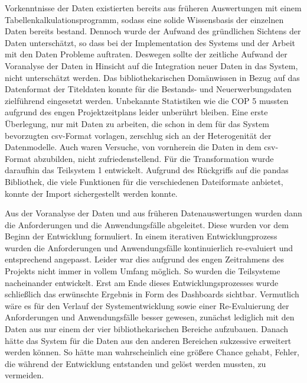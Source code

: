 Vorkenntnisse der Daten existierten bereits aus früheren Auswertungen mit einem Tabellenkalkulationsprogramm, sodass eine solide Wissensbasis 
der einzelnen Daten bereits bestand. Dennoch wurde der Aufwand des gründlichen Sichtens der Daten unterschätzt, so dass bei 
der Implementation des Systems und der Arbeit mit den Daten Probleme auftraten. Deswegen sollte der zeitliche Aufwand der Voranalyse der Daten in Hinsicht auf die Integration neuer
Daten in das System, nicht unterschätzt werden. Das bibliothekarischen Domänwissen in Bezug auf das Datenformat der Titeldaten konnte
für die Bestands- und Neuerwerbungsdaten zielführend eingesetzt werden. Unbekannte Statistiken wie die \acrlong{COP 5} mussten aufgrund des engen Projektzeitplans leider unberührt bleiben.
Eine erste Überlegung, nur mit Daten zu arbeiten, die schon in dem für das System bevorzugten csv-Format vorlagen, 
zerschlug sich an der Heterogenität der Datenmodelle. Auch waren Versuche, von vornherein die Daten in dem csv-Format abzubilden, nicht zufriedenstellend.
Für die Transformation wurde daraufhin das Teilsystem 1 entwickelt.
Aufgrund des Rückgriffs auf die pandas Bibliothek, die viele Funktionen für die verschiedenen Dateiformate anbietet, konnte der Import sichergestellt werden konnte.

Aus der Voranalyse der Daten und aus früheren Datenauswertungen wurden dann die Anforderungen und die Anwendungsfälle abgeleitet.
Diese wurden vor dem Beginn der Entwicklung formuliert. In einem iterativen Entwicklungprozess wurden die Anforderungen und Anwendungsfälle kontinuierlich re-evaluiert und 
entsprechend angepasst. Leider war dies aufgrund des engen Zeitrahmens des Projekts nicht immer in vollem Umfang möglich. So wurden die Teilsysteme nacheinander entwickelt. 
Erst am Ende dieses Entwicklungsprozesses wurde schließlich das erwünschte Ergebnis in Form des Dashboards sichtbar. Vermutlich wäre es für den Verlauf der Systementwicklung sowie einer
Re-Evaluierung der Anforderungen und Anwendungsfälle besser gewesen, zunächst lediglich mit den Daten aus nur einem der vier bibliothekarischen Bereiche
aufzubauen. Danach hätte das System für die Daten aus den anderen Bereichen sukzessive erweitert werden können. 
So hätte man wahrscheinlich eine größere Chance gehabt, Fehler, die während der Entwicklung entstanden und gelöst werden mussten, zu vermeiden.



